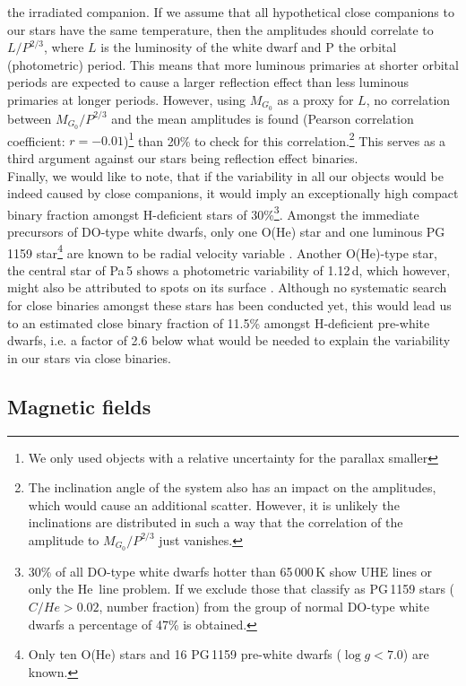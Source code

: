 \documentclass{aa}
\newcounter{Rco}
\newcommand{\Ionst}[1]{\setcounter{Rco}{#1}\Roman{Rco}}
\newcommand{\Ion}[2]{\mbox{#1\,{\scriptsize\Ionst{#2}}}}
\newcommand{\logg}{\mbox{$\log g$}\xspace}
\begin{document}
the irradiated companion. If we assume that all hypothetical close
companions to our stars have the same temperature, then the amplitudes should
correlate to $L/P^{2/3}$, where $L$ is the luminosity of the white dwarf and
P the orbital (photometric) period. This means that more luminous primaries
at shorter orbital periods are expected to cause a larger reflection effect
than less luminous primaries at longer periods. However, using $M_{G_0}$ as a proxy for
$L$, no correlation between $M_{G_0}/P^{2/3}$ and the mean amplitudes is
found (Pearson correlation coefficient: $r=-0.01$)\footnote{We only used
  objects with a relative uncertainty for the parallax smaller}
  than 20\% to check for this correlation.\footnote{The inclination angle
  of the system also has an impact on the amplitudes, which would cause an
  additional scatter. However, it is unlikely the inclinations are distributed
  in such a way that the correlation of the amplitude to $M_{G_0}/P^{2/3}$ just vanishes.}
This serves as a third argument against our stars being reflection effect
binaries.\\
Finally, we would like to note, that if the variability in all our objects
would be indeed caused by close companions, it would imply an
exceptionally high compact binary fraction amongst H-deficient stars
of 30\%\footnote{30\% of all DO-type white dwarfs hotter than 65\,000\,K
  show UHE lines or only the \Ion{He}{2} line problem. If we exclude those
that classify as PG\,1159 stars ($C/He>0.02$, number fraction) from the group
of normal DO-type white dwarfs a percentage of 47\% is obtained.}.
Amongst the immediate precursors of DO-type white dwarfs, only one O(He)
star and one luminous PG\,1159 star\footnote{Only ten O(He) stars and 16 PG\,1159
  pre-white dwarfs (\logg$<7.0$) are known.} are known to be
radial velocity variable \citep{Reindl+2016}. Another O(He)-type star, the
central star of Pa\,5 shows a photometric variability of 1.12\,d, which
however, might also be attributed to spots on its surface
\citep{DeMarco+2015}. Although no systematic search for close binaries
amongst these stars has been conducted yet, this would lead us to an estimated
close binary fraction of 11.5\% amongst H-deficient pre-white dwarfs, i.e.
a factor of 2.6 below what would be needed to explain the variability in our
stars via close binaries.
 
\subsection{Magnetic fields}
\label{sect:magneticfields}
 
\end{document}
